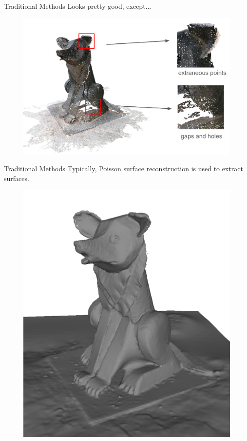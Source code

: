 \documentclass[10pt]{beamer}
\begin{document}
\begin{frame}{Traditional Methods}
    Looks pretty good, except...
    
    \begin{figure}
        \centering
        \includegraphics[width=0.8\linewidth]{figures/intro/issues.png}
    \end{figure}
\end{frame}

\begin{frame}{Traditional Methods}
    Typically, \alert{Poisson surface reconstruction} \citep{kazhdan2006poisson} is used to extract surfaces.
    
    \begin{figure}
        \centering
        \includegraphics[width=0.5\linewidth]{figures/intro/psr.png}
    \end{figure}
\end{frame}
\end{document}
